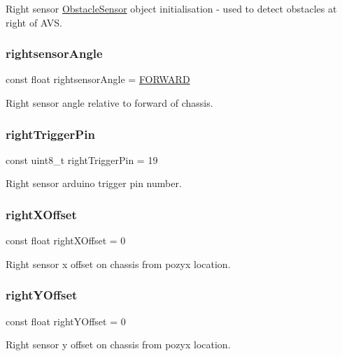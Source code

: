 Right sensor \mbox{\hyperlink{class_obstacle_sensor}{Obstacle\+Sensor}} object initialisation -\/ used to detect obstacles at right of A\+VS. 

\mbox{\label{bot_main_8ino_a83724535498f068d5b44150a2bc4fcf8}} 
\subsubsection{\texorpdfstring{rightsensor\+Angle}{rightsensorAngle}}
{\footnotesize\ttfamily const float rightsensor\+Angle = \mbox{\hyperlink{bot_main_8ino_a6ddfdda7a062d10cff4a72b76b44aeb8}{F\+O\+R\+W\+A\+RD}}}



Right sensor angle relative to forward of chassis. 

\mbox{\label{bot_main_8ino_a906054d9d48970211789ac841d331898}} 
\subsubsection{\texorpdfstring{right\+Trigger\+Pin}{rightTriggerPin}}
{\footnotesize\ttfamily const uint8\+\_\+t right\+Trigger\+Pin = 19}



Right sensor arduino trigger pin number. 

\mbox{\label{bot_main_8ino_ac932cddb5bc68094c96d0034c92faef9}} 
\subsubsection{\texorpdfstring{right\+X\+Offset}{rightXOffset}}
{\footnotesize\ttfamily const float right\+X\+Offset = 0}



Right sensor x offset on chassis from pozyx location. 

\mbox{\label{bot_main_8ino_a07903b96b48e8e456debd9cc43c7af05}} 
\subsubsection{\texorpdfstring{right\+Y\+Offset}{rightYOffset}}
{\footnotesize\ttfamily const float right\+Y\+Offset = 0}



Right sensor y offset on chassis from pozyx location. 

